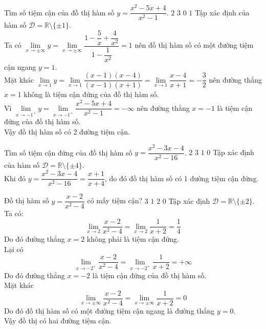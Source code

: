 \begin{ex}%
	Tìm số tiệm cận của đồ thị hàm số $ y=\dfrac{x^2-5x+4}{x^2-1} $.
	\choice
	{\True $ 2 $}
	{$ 3 $}
	{$ 0 $}
	{$ 1 $}
	\loigiai
	{
		Tập xác định của hàm số $ \mathscr{D} = \mathbb{R} \setminus \{\pm 1\} $.\\
		Ta có $ \lim \limits_{x \to \pm \infty} y = \lim \limits_{x \to \pm \infty} \dfrac{1-\dfrac{5}{x}+\dfrac{4}{x^2}}{1-\dfrac{1}{x^2}}=1$ nên đồ thị hàm số có một đường tiệm cận ngang $ y=1 $.\\
		Mặt khác $ \lim \limits_{x \to 1} y =\lim \limits_{x \to 1} \dfrac{(x-1)(x-4)}{(x-1)(x+1)}=\lim \limits_{x \to 1} \dfrac{x-4}{x+1}=-\dfrac{3}{2}$ nên đường thẳng $ x=1 $ không là tiệm cận đứng của đồ thị hàm số.\\
		Vì $ \lim \limits_{x \to -1^{+}} y =\lim \limits_{x \to -1^{+}} \dfrac{x^2-5x+4}{x^2-1}=-\infty$ nên đường thẳng $ x=-1 $ là tiệm cận đứng của đồ thị hàm số.\\
		Vậy đồ thị hàm số có 2 đường tiệm cận.
	}
\end{ex}
\begin{ex}%
	Tìm số tiệm cận đứng của đồ thị hàm số $ y=\dfrac{x^2-3x-4}{x^2-16} $.
	\choice
	{$ 2 $}
	{$ 3 $}
	{\True $ 1 $}
	{$ 0 $}
	\loigiai
	{
		Tập xác định của hàm số $ \mathscr{D}=\mathbb{R} \setminus \{\pm 4\} $.\\
		Khi đó $ y= \dfrac{x^2-3x-4}{x^2-16}=\dfrac{x+1}{x+4}$, do đó đồ thị hàm số có 1 đường tiệm cận đứng.
	}
\end{ex}
\begin{ex}%
	Đồ thị hàm số $ y=\dfrac{x-2}{x^2-4} $ có mấy tiệm cận?
	\choice
	{$ 3 $}
	{$ 1 $}
	{\True $ 2 $}
	{$ 0 $}
	\loigiai
	{
		Tập xác định $ \mathscr{D}=\mathbb{R} \setminus \{\pm 2\} $.\\
		Ta có: 
		\[\lim \limits_{x \to 2} \dfrac{x-2}{x^2-4}=\lim \limits_{x \to 2} \dfrac{1}{x+2}=\dfrac{1}{4}\]
		Do đó đường thẳng $ x=2 $ không phải là tiệm cận đứng.\\
		Lại có 
		\[\lim \limits_{x \to -2^{+}} \dfrac{x-2}{x^2-4}=\lim \limits_{x \to -2^{+}} \dfrac{1}{x+2}=+\infty\]
		Do đó đường thẳng $ x=-2 $ là tiệm cận đứng của đồ thị hàm số.\\
		Mặt khác 
		\[\lim \limits_{x \to \pm \infty} \dfrac{x-2}{x^2-4}=\lim \limits_{x \to \pm \infty} \dfrac{1}{x+2}=0\]
		Do đó đồ thị hàm số có một đường tiệm cận ngang là đường thẳng $ y=0 $.\\
		Vậy đồ thị có hai đường tiệm cận.
	}
\end{ex}
